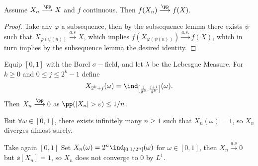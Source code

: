 \documentclass[../main.tex]{subfiles}
\begin{document}
   \begin{application}
       Assume $X_n \overset{\pp}{\longrightarrow}X$ and $f$ continuous. Then
       $f(X_n) \overset{\pp}{\longrightarrow} f(X)$.
   \end{application}
   \begin{proof}
       Take any $\varphi$ a subsequence, then by the subsequence lemma there
       exists $\psi$ such that $X_{\varphi(\psi(n))}
       \overset{a.s}{\longrightarrow} X$, which implies
       $f(X_{\varphi(\psi(n))}) \overset{a.s.}{\longrightarrow} f(X)$, which
       in turn implies by the subsequence lemma the desired identity.
   \end{proof}
   \begin{example}
     Equip $[0, 1]$ with the Borel $\sigma-$field, and let $\lambda$ be the
     Lebesgue Measure. For $k\geq0$ and $0 \leq j \leq 2^k - 1$ define
     \[
       X_{2^k + j}(\omega) = \ind_{\left[\frac{j}{2^k}, \frac{j+1}{2^k} \right]}(\omega)
     .\] 
   Then $X_n \overset{\pp}{\longrightarrow} 0 $ as $\pp(|X_n| > \varepsilon)
     \leq 1/n$.

     \noindent
     But $\forall \omega \in [0, 1]$, there exists infinitely many $n \geq 1$
     such that $X_n(\omega) = 1$, so $X_n$ diverges almost surely.
   \end{example}
   \begin{example}
     Take again $[0, 1]$
     Set $X_n(\omega) = 2^n \ind_{[0, 1/2^n]}(\omega)$ for $\omega \in[0, 1]$,
     then $X_n \overset{a.s}{\longrightarrow} 0$ but $\ee[X_n] = 1$, so $X_n$
     does not converge to $0$ by $L^1$.
   \end{example}
\end{document}
